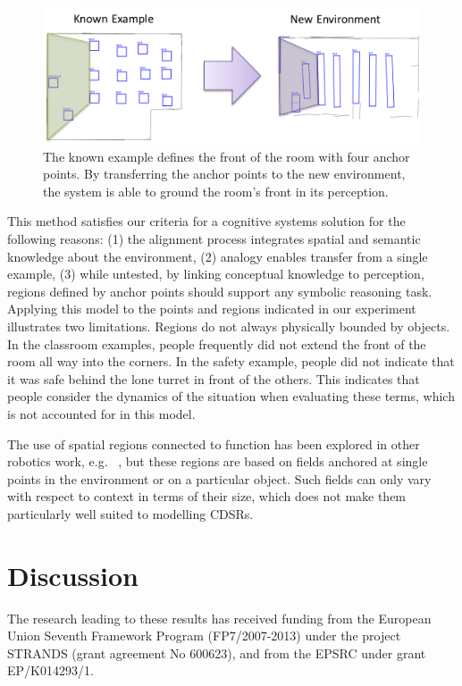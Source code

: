 \documentclass[11pt,letterpaper]{article}
\begin{document}
\begin{figure}
  \includegraphics[width=\columnwidth]{figures/classroom-transfer.png}
  \caption{The known example defines the front of the room with four anchor points.  By transferring the anchor points to the new environment, the system is able to ground the room's front in its perception.}
  \label{fig:anchor-point-transfer}
\end{figure}

This method satisfies our criteria for a cognitive systems solution for the following reasons: (1) the alignment process integrates spatial and semantic knowledge about the environment, (2) analogy enables transfer from a single example, (3) while untested, by linking conceptual knowledge to perception, regions defined by anchor points should support any symbolic reasoning task. Applying this model to the points and regions indicated in our experiment illustrates two limitations.  Regions do not always physically bounded by objects.  In the classroom examples, people frequently did not extend the front of the room all way into the corners.  In the safety example, people did not indicate that it was safe behind the lone turret in front of the others.  This indicates that people consider the dynamics of the situation when evaluating these terms, which is not accounted for in this model.

The use of spatial regions connected to function has been explored in other robotics work, e.g. ~\cite{Karg:2012,Fasola:2013}, but these regions are based on fields anchored at single points in the environment or on a particular object. Such fields can only vary with respect to context in terms of their size, which does not make them particularly well suited to modelling CDSRs.


\section{Discussion}
 
\begin{acknowledgements} 
\noindent
The research leading to these results has received funding from the European Union Seventh Framework Program (FP7/2007-2013) under the project STRANDS (grant agreement No 600623), and from the EPSRC under grant EP/K014293/1.
\end{acknowledgements} 




\vspace{-0.25in}

{\parindent -10pt\leftskip 10pt\noindent



}

\end{document}
